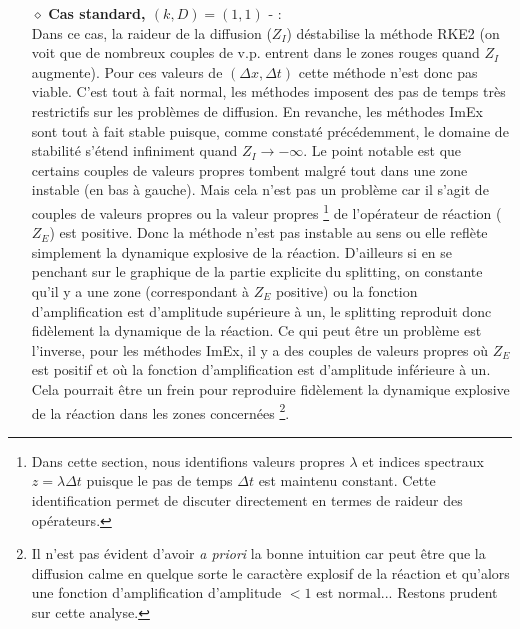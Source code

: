             \begin{itemize}
                \item[$\diamond$]\textbf{Cas standard, $(k,D)=(1,1)$} - :\\
                    Dans ce cas, la raideur de la diffusion ($Z_I$) déstabilise la méthode RKE2 (on voit que de nombreux couples de v.p. entrent dans le zones rouges quand $Z_I$ augmente).
                    Pour ces valeurs de $(\Delta x, \Delta t)$ cette méthode n'est donc pas viable.
                    C'est tout à fait normal, les méthodes imposent des pas de temps très restrictifs sur les problèmes de diffusion.
                    En revanche, les méthodes ImEx sont tout à fait stable puisque, comme constaté précédemment, le domaine de stabilité s'étend infiniment quand $Z_I \rightarrow -\infty$.
                    Le point notable est que certains couples de valeurs propres tombent malgré tout dans une zone instable (en bas à gauche). Mais cela n'est pas un problème car il s'agit 
                    de couples de valeurs propres ou la valeur propres
                    \footnote{Dans cette section, nous identifions valeurs propres $\lambda$ et indices spectraux $z = \lambda \Delta t$ puisque le pas de temps $\Delta t$ est maintenu constant. Cette identification permet de discuter directement en termes de raideur des opérateurs.}
                    de l'opérateur de réaction ($Z_E$) est positive. Donc la méthode n'est pas instable au sens ou elle reflète simplement
                    la dynamique explosive de la réaction. D'ailleurs si en se penchant sur le graphique de la partie explicite du splitting, on constante qu'il y a une zone 
                    (correspondant à $Z_E$ positive) ou la fonction d'amplification est d'amplitude supérieure à un, le splitting reproduit donc fidèlement la dynamique de la réaction.
                    Ce qui peut être un problème est l'inverse, 
                    pour les méthodes ImEx, il y a des couples de valeurs propres où $Z_E$ est positif et où la fonction d'amplification est d'amplitude inférieure à un. 
                    Cela pourrait être un frein pour reproduire fidèlement la dynamique explosive de la réaction dans les zones concernées
                    \footnote{Il n'est pas évident d'avoir \textit{a priori} la bonne intuition car peut être que la diffusion calme en quelque sorte 
                    le caractère explosif de la réaction et qu'alors une fonction d'amplification d'amplitude $< 1$ est normal... Restons prudent sur cette analyse.}.

\end{itemize}
